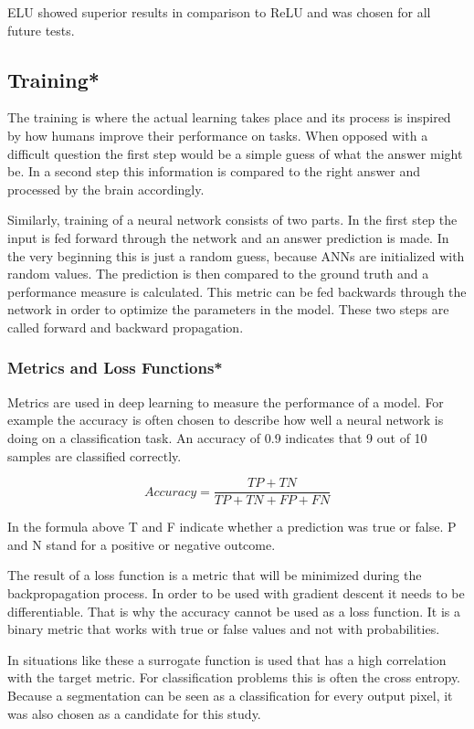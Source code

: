 ELU showed superior results in comparison to ReLU and was chosen for all future tests.

\subsection{Training*}

The training is where the actual learning takes place and its process is inspired by how humans improve their performance on tasks. When opposed with a difficult question the first step would be a simple guess of what the answer might be. In a second step this information is compared to the right answer and processed by the brain accordingly.

Similarly, training of a neural network consists of two parts. In the first step the input is fed forward through the network and an answer prediction is made. In the very beginning this is just a random guess, because ANNs are initialized with random values. The prediction is then compared to the ground truth and a performance measure is calculated. This metric can be fed backwards through the network in order to optimize the parameters in the model. These two steps are called forward and backward propagation.

\subsubsection{Metrics and Loss Functions*}

Metrics are used in deep learning to measure the performance of a model. For example the accuracy is often chosen to describe how well a neural network is doing on a classification task. An accuracy of 0.9 indicates that 9 out of 10 samples are classified correctly.

\begin{equation}
Accuracy = \frac{TP+TN}{TP+TN+FP+FN}
\end{equation}

In the formula above T and F indicate whether a prediction was true or false. P and N stand for a positive or negative outcome.

The result of a loss function is a metric that will be minimized during the backpropagation process. In order to be used with gradient descent it needs to be differentiable. That is why the accuracy cannot be used as a loss function. It is a binary metric that works with true or false values and not with probabilities.

In situations like these a surrogate function is used that has a high correlation with the target metric. For classification problems this is often the cross entropy. Because a segmentation can be seen as a classification for every output pixel, it was also chosen as a candidate for this study.

